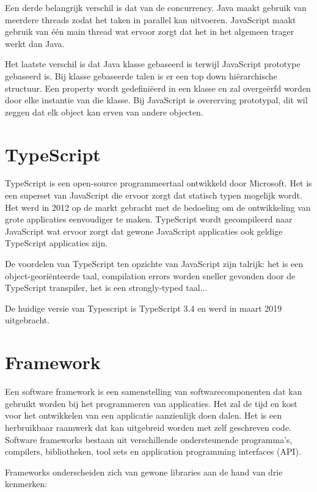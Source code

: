  Een derde belangrijk verschil is dat van de concurrency. Java maakt gebruik van meerdere threads zodat het taken in parallel kan uitvoeren. JavaScript maakt gebruik van één main thread wat ervoor zorgt dat het in het algemeen trager werkt dan Java.
 
 Het laatste verschil is dat Java klasse gebaseerd is terwijl JavaScript prototype gebaseerd is. Bij klasse gebaseerde talen is er een top down hiërarchische structuur. 
 Een property  wordt gedefiniëerd in een klasse en zal overgeërfd worden door elke instantie van die klasse. Bij JavaScript is overerving prototypal, dit wil zeggen dat elk object kan erven van andere objecten.   
 
 \section{TypeScript}
 TypeScript is een open-source programmeertaal ontwikkeld door Microsoft. Het is een superset van JavaScript die ervoor zorgt dat statisch typen mogelijk wordt. Het werd in 2012 op de markt gebracht met de bedoeling om de ontwikkeling van grote applicaties eenvoudiger te maken. TypeScript wordt gecompileerd naar JavaScript wat ervoor zorgt dat gewone JavaScript applicaties ook geldige TypeScript applicaties zijn. 
 
 De voordelen van TypeScript ten opzichte van JavaScript zijn talrijk: het is een object-georiënteerde taal, compilation errors worden sneller gevonden door de TypeScript transpiler, het is een strongly-typed taal...
 
 De huidige versie van Typescript is TypeScript 3.4 en werd in maart 2019 uitgebracht.

\section{Framework}

Een software framework is een samenstelling van softwarecomponenten dat kan gebruikt worden bij het programmeren van applicaties. Het zal de tijd en kost voor het ontwikkelen van een applicatie aanzienlijk doen dalen. 
Het is een herbruikbaar raamwerk dat kan uitgebreid worden met zelf geschreven code. Software frameworks bestaan uit verschillende ondersteunende programma's, compilers, bibliotheken, tool sets en application programming interfaces (API).

Frameworks onderscheiden zich van gewone libraries aan de hand van drie kenmerken:

